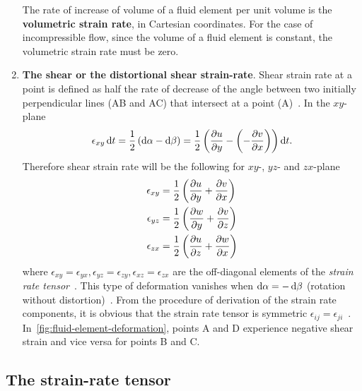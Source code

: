 \begin{enumerate}
    The rate of increase of volume of a fluid element per unit volume is the \textbf{volumetric strain rate}, in Cartesian coordinates.
    For the case of incompressible flow, since the volume of a fluid element is constant, the volumetric strain rate must be zero.
  \item \textbf{The shear or the distortional shear strain-rate}.\quad
    Shear strain rate at a point is defined as half the rate of decrease of the angle between two initially perpendicular lines (AB and AC) that intersect at a point (A)~\cite{courseUniGeBottaro}.
    In the \(xy\)-plane
    \begin{equation}
      \epsilon_{xy} \d t = \f{1}{2} \left(\d \alpha - \d \beta\right) = \f{1}{2} \left(\ddy{u} - \left(-\ddx{v}\right)\right) \d t.
      \label{eq:shear-strain-xy-plane}
    \end{equation}
    Therefore shear strain rate will be the following for \(xy\)-, \(yz\)- and \(zx\)-plane
    \begin{equation}
      \begin{aligned}
        \epsilon_{xy} &= \f{1}{2} \left(\ddy{u} + \ddx{v}\right) \\
        \epsilon_{yz} &= \f{1}{2} \left(\ddy{w} + \ddz{v}\right) \\
        \epsilon_{zx} &= \f{1}{2} \left(\ddz{u} + \ddx{w}\right)
      \end{aligned}
      \label{eq:shear-strain-rate-components}
    \end{equation}
    where \(\epsilon_{xy} = \epsilon_{yx}, \epsilon_{yz} = \epsilon_{zy}, \epsilon_{xz} = \epsilon_{zx}\) are the off-diagonal elements of the \emph{strain rate tensor}~\cite{ghazanfarian2024applied}.
    This type of deformation vanishes when \(\mathop{}\!\mathrm{d} \alpha = -\mathop{}\!\mathrm{d} \beta\) (rotation without distortion)~\cite{ghazanfarian2024applied}.
    From the procedure of derivation of the strain rate components, it is obvious that the strain rate tensor is symmetric \(\epsilon_{ij} = \epsilon_{ji}\)~\cite{ghazanfarian2024applied}.
    In~\cref{fig:fluid-element-deformation}, points A and D experience negative shear strain and vice versa for points B and C.
\end{enumerate}


\subsection{The strain-rate tensor} %

